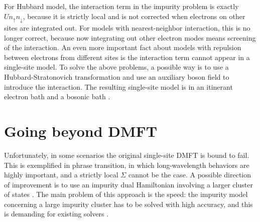 \documentclass[hyperref, a4paper]{article}
\begin{document}
For Hubbard model, the interaction term in the impurity problem is exactly $U n_{\uparrow} n_{\downarrow}$,
because it is strictly local and is not corrected 
when electrons on other sites are integrated out.
For models with nearest-neighbor interaction,
this is no longer correct,
because now integrating out other electron modes 
means screening of the interaction.
An even more important fact about models with repulsion between electrons from different sites 
is the interaction term cannot appear in a single-site model.
To solve the above problems, 
a possible way is to use a Hubbard-Stratonovich transformation 
and use an auxiliary boson field to introduce the interaction.
The resulting single-site model 
is in an itinerant electron bath 
and a bosonic bath \cite{sun_extended_2002}.



\section{Going beyond DMFT}\label{sec:more}

Unfortunately, in some scenarios the original single-site DMFT is bound to fail.
This is exemplified in phrase transition,
in which long-wavelength behaviors are highly important,
and a strictly local $\Sigma$ cannot be the case.
A possible direction of improvement is 
to use an impurity dual Hamiltonian involving a larger cluster of states 
\cite{kotliar_cellular_2001,park_cluster_2008}.
The main problem of this approach is the speed:
the impurity model concerning a large impurity cluster has to be solved with high accuracy,
and this is demanding for existing solvers 
\cite{potthoff_cluster_2018,gull_continuous-time_2011}.
\end{document}
